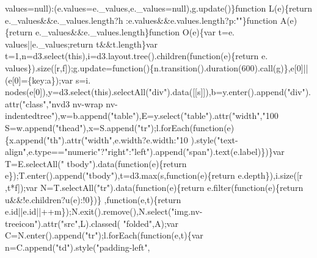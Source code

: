 \begin{DoxyCode}
      values=null):(e.values=e.\_values,e.\_values=null),g.update()\}\textcolor{keyword}{function} L(e)\{\textcolor{keywordflow}{return} e.\_values&&e.\_values.length?h
      :e.values&&e.values.length?p:\textcolor{stringliteral}{""}\}\textcolor{keyword}{function} A(e)\{\textcolor{keywordflow}{return} e.\_values&&e.\_values.length\}\textcolor{keyword}{function} O(e)\{var t=e.
      values||e.\_values;\textcolor{keywordflow}{return} t&&t.length\}var t=1,n=d3.select(\textcolor{keyword}{this}),i=d3.layout.tree().children(\textcolor{keyword}{function}(e)\{\textcolor{keywordflow}{return} e.
      values\}).size([r,f]);g.update=\textcolor{keyword}{function}()\{n.transition().duration(600).call(g)\},e[0]||(e[0]=\{key:a\});var s=i.
      nodes(e[0]),y=d3.select(\textcolor{keyword}{this}).selectAll(\textcolor{stringliteral}{"div"}).data([[s]]),b=y.enter().append(\textcolor{stringliteral}{"div"}).attr(\textcolor{stringliteral}{"class"},\textcolor{stringliteral}{"nvd3
       nv-wrap nv-indentedtree"}),w=b.append(\textcolor{stringliteral}{"table"}),E=y.select(\textcolor{stringliteral}{"table"}).attr(\textcolor{stringliteral}{"width"},\textcolor{stringliteral}{"100%
      S=w.append(\textcolor{stringliteral}{"thead"}),x=S.append(\textcolor{stringliteral}{"tr"});l.forEach(\textcolor{keyword}{function}(e)\{x.append(\textcolor{stringliteral}{"th"}).attr(\textcolor{stringliteral}{"width"},e.width?e.width:\textcolor{stringliteral}{"10%
      ).style(\textcolor{stringliteral}{"text-align"},e.type==\textcolor{stringliteral}{"numeric"}?\textcolor{stringliteral}{"right"}:\textcolor{stringliteral}{"left"}).append(\textcolor{stringliteral}{"span"}).text(e.label)\})\}var T=E.selectAll(\textcolor{stringliteral}{"
      tbody"}).data(\textcolor{keyword}{function}(e)\{\textcolor{keywordflow}{return} e\});T.enter().append(\textcolor{stringliteral}{"tbody"}),t=d3.max(s,\textcolor{keyword}{function}(e)\{\textcolor{keywordflow}{return} e.depth\}),i.size([r
      ,t*f]);var N=T.selectAll(\textcolor{stringliteral}{"tr"}).data(\textcolor{keyword}{function}(e)\{\textcolor{keywordflow}{return} e.filter(\textcolor{keyword}{function}(e)\{\textcolor{keywordflow}{return} u&&!e.children?u(e):!0\})\}
      ,function(e,t)\{\textcolor{keywordflow}{return} e.id||e.id||++m\});N.exit().remove(),N.select(\textcolor{stringliteral}{"img.nv-treeicon"}).attr(\textcolor{stringliteral}{"src"},L).classed(\textcolor{stringliteral}{
      "folded"},A);var C=N.enter().append(\textcolor{stringliteral}{"tr"});l.forEach(\textcolor{keyword}{function}(e,t)\{var n=C.append(\textcolor{stringliteral}{"td"}).style(\textcolor{stringliteral}{"padding-left"},\textcolor{keyword}{
}}}
\end{DoxyCode}
